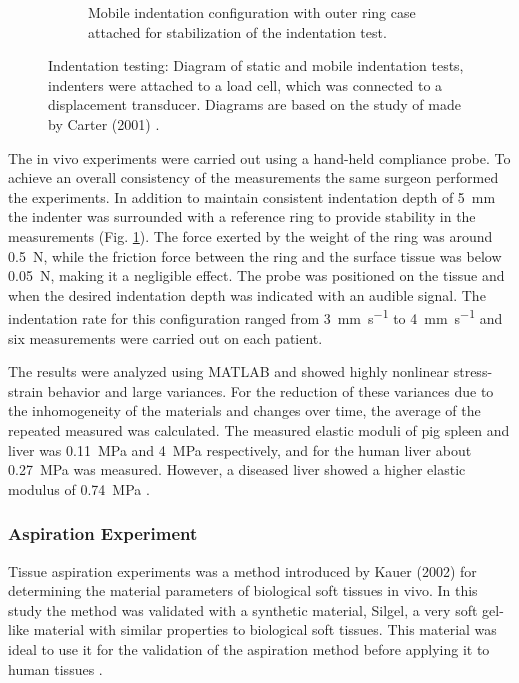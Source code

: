 \begin{figure}
\begin{subfigure}[b]{0.45\textwidth}
        \caption{Mobile indentation configuration with outer ring case attached for stabilization of the indentation test.}
        \label{fig:carter2}
        \end{subfigure}
        \hspace{0.3cm}
        \caption{Indentation testing: Diagram of static and mobile indentation tests, indenters were attached to a load cell, which was connected to a displacement transducer. Diagrams are based on the study of made by Carter (2001) \cite{Carter2001}.}
        \label{fig:indentationcarter}
\end{figure}

The in vivo experiments were carried out using a hand-held compliance probe. To achieve 
an overall consistency of the measurements the same surgeon performed the experiments. 
In addition to maintain consistent indentation depth of \SI{5}{\milli \m} the indenter was 
surrounded with a reference ring to provide stability in the measurements (Fig. \ref{fig:carter2}). The force 
exerted by the weight of the ring was around \SI{0.5}{\newton}, while the friction force 
between the ring and the surface tissue was below \SI{0.05}{\newton}, making it a negligible 
effect. The probe was positioned on the tissue and when the desired indentation depth was 
indicated with an audible signal. The indentation rate for this configuration ranged 
from \SI[per-mode = symbol]{3}{\milli \m\per \second} to \SI[per-mode = symbol]{4}{\milli \m\per \second} and 
six measurements were carried out on each patient.

The results were analyzed using MATLAB and showed highly nonlinear stress-strain behavior and large variances. 
For the reduction of these variances due to the inhomogeneity of the materials and changes over time, 
the average of the repeated measured was calculated. The measured elastic moduli of pig 
spleen and liver was \SI{0.11}{\mega \pascal} and \SI{4}{\mega \pascal} respectively, and 
for the human liver about \SI{0.27}{\mega \pascal} was measured. However, a 
diseased liver showed a higher elastic modulus of \SI{0.74}{\mega \pascal} \cite{Carter2001}.
\subsubsection*{Aspiration Experiment}

Tissue aspiration experiments was a method introduced by Kauer (2002) for determining 
the material parameters of biological soft tissues in vivo.
In this study the method was validated with a synthetic material, Silgel, a very 
soft gel-like material with similar properties to biological soft tissues. 
This material was ideal to use it for the validation of the 
aspiration method before applying it to human tissues \cite{Kauer2002}.

